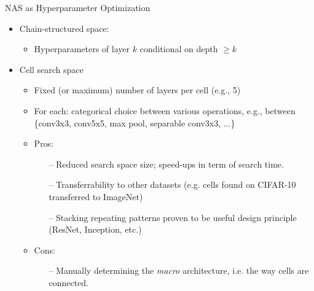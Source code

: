 \begin{frame}[c]{NAS as Hyperparameter Optimization}
\begin{itemize}
	\item Chain-structured space:
	\begin{itemize}
		\item Hyperparameters of layer $k$ conditional on depth $\geq k$
	\end{itemize}
	\item Cell search space
	\begin{itemize}
		\item Fixed (or maximum) number of layers per cell (e.g., 5)
		\item For each: categorical choice between various operations, e.g.,
		between \{conv3x3, conv5x5, max pool, separable conv3x3, ...\}
		\pause	
		\item \alert{Pros:}
		\begin{itemize}
			\item[--] Reduced search space size; speed-ups in term of search time.
			\item[--] Transferrability to other datasets (e.g. cells found on
			CIFAR-10 transferred to ImageNet)
			\item[--] Stacking repeating patterns proven to be useful design principle 
			(ResNet, Inception, etc.)
		\end{itemize}
		\pause
		\item \alert{Cons:}
		\begin{itemize}
			\item[--] Manually determining the \textit{macro} architecture, 
			i.e. the way cells are connected.
		\end{itemize}

	\end{itemize}
\end{itemize}

\end{frame}


